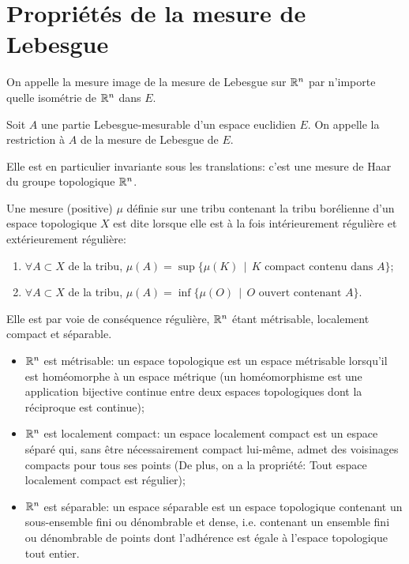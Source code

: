 \section{Propriétés de la mesure de Lebesgue}


On appelle 
la mesure image de la mesure de Lebesgue
sur $\mathbb R^n$ par n'importe quelle isométrie de $\mathbb R^n$ dans $E$.

Soit $A$ une partie Lebesgue-mesurable d'un espace euclidien $E$.
On appelle  la restriction à $A$ de la mesure de Lebesgue de $E$.

{}
Elle est en particulier invariante sous les translations: c'est une mesure de Haar du groupe topologique $\mathbb R^n$.

\begin{definition}
Une mesure (positive) $\mu$ définie sur une tribu contenant la tribu borélienne d'un espace
topologique $X$ est dite  lorsque elle est
à la fois intérieurement régulière et extérieurement régulière:
\begin{enumerate}
   \item $\forall A\subset X$ de la tribu, $\mu(A)=\sup\{\mu(K)\,\mid\, K \text{ compact contenu dans } A\} $;
   \item $\forall A\subset X$ de la tribu, $\mu(A)=\inf\{\mu(O)\,\mid\, O \text{ ouvert contenant } A\}$.
\end{enumerate}
\end{definition}

{}

Elle est par voie de conséquence régulière, $\mathbb R^n$ étant métrisable, localement compact et séparable.
\begin{itemize}
   \item $\mathbb R^n$ est métrisable: un espace topologique est un espace métrisable lorsqu'il est
	homéomorphe à un espace métrique (un homéomorphisme est une application bijective
	continue entre deux espaces topologiques dont la réciproque est continue);
   \item $\mathbb R^n$ est localement compact: un espace localement compact est un espace séparé qui,
	sans être nécessairement compact lui-même, admet des voisinages compacts pour tous
	ses points (De plus, on a la propriété: Tout espace localement compact est régulier);
   \item $\mathbb R^n$ est séparable: un espace séparable est un espace topologique contenant un
	sous-ensemble fini ou dénombrable et dense, i.e. contenant un ensemble fini ou dénombrable
	de points dont l'adhérence est égale à l'espace topologique tout entier.
\end{itemize}

